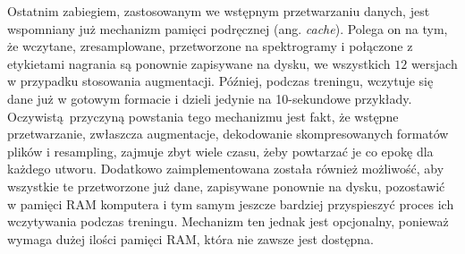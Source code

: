 Ostatnim zabiegiem, zastosowanym we wstępnym przetwarzaniu danych, jest wspomniany już mechanizm pamięci podręcznej (ang. \emph{cache}). Polega on na tym, że wczytane, zresamplowane, przetworzone na spektrogramy i połączone z etykietami nagrania są ponownie zapisywane na dysku, we wszystkich $12$ wersjach w przypadku stosowania augmentacji. Później, podczas treningu, wczytuje się dane już w gotowym formacie i dzieli jedynie na 10-sekundowe przykłady. Oczywistą przyczyną powstania tego mechanizmu jest fakt, że wstępne przetwarzanie, zwłaszcza augmentacje, dekodowanie skompresowanych formatów plików i resampling, zajmuje zbyt wiele czasu, żeby powtarzać je co epokę dla każdego utworu. Dodatkowo zaimplementowana została również możliwość, aby wszystkie te przetworzone już dane, zapisywane ponownie na dysku, pozostawić w pamięci RAM komputera i tym samym jeszcze bardziej przyspieszyć proces ich wczytywania podczas treningu. Mechanizm ten jednak jest opcjonalny, ponieważ wymaga dużej ilości pamięci RAM, która nie zawsze jest dostępna.
